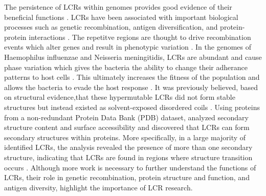 \documentclass[10pt]{article}
\begin{document}
The persistence of LCRs within genomes provides good evidence of their beneficial functions \cite{verstrepen2005intragenic}.
LCRs have been associated with important biological processes such as genetic recombination, antigen diversification, and
protein-protein interactions \citep{karlin2002amino, verstrepen2005intragenic, kumari2015low}. The repetitve regions are thought
to drive recombination events which alter genes and result in phenotypic variation \citep{verstrepen2005intragenic}. In the genomes of
Haemophilus influenzae and Neisseria meningitidis, LCRs are abundant and cause phase variation which gives the bacteria the
ability to change their adherance patterns to host cells \citep{bayliss2001simple}. This ultimately increases the fitness of the population and allows the bacteria to evade the host response \citep{bayliss2001simple}. It was previously believed, based on structural evidence,that these hypermutable LCRs did not form stable structures but instead existed as solvent-exposed disordered coils \citep{wootton1993statistics, huntley2002simple, depristo2006abundance}. Using proteins from a non-redundant Protein Data Bank (PDB) dataset, \citet{kumari2015low} analyzed secondary structure content and surface accessibility and discovered that LCRs
can form secondary structures within proteins. More specifically, in a large majority of identified LCRs, the analysis revealed
the presence of more than one secondary structure, indicating that LCRs are found in regions where structure transition occurs
\citep{kumari2015low}. Although more work is necessary to further understand the functions of LCRs, their role in genetic
recombination, protein structure and function, and antigen diversity, highlight the importance of LCR research.
\end{document}

